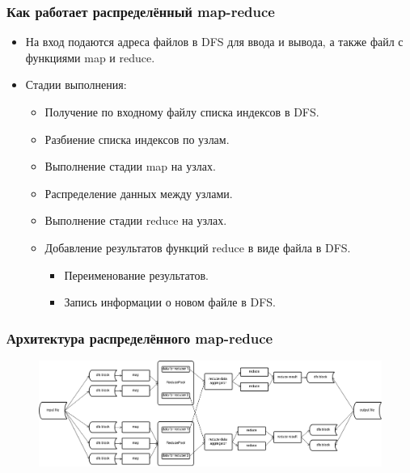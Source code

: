 \documentclass{beamer}
\begin{document}
    \begin{frame}
    \frametitle{Как работает распределённый map-reduce}
        \begin{itemize}
            \item На вход подаются адреса файлов в DFS для ввода и вывода, а также файл с функциями map и reduce.
            \item Стадии выполнения:
            \begin{itemize}
                \item Получение по входному файлу списка индексов в DFS.
                \item Разбиение списка индексов по узлам.
                \item Выполнение стадии map на узлах.
                \item Распределение данных между узлами.
                \item Выполнение стадии reduce на узлах.
                \item Добавление результатов функций reduce в виде файла в DFS.
                \begin{itemize}
                    \item Переименование результатов.
                    \item Запись информации о новом файле в DFS.
                \end{itemize} 
            \end{itemize} 
        \end{itemize}        
    \end{frame}

    \begin{frame}
    \frametitle{Архитектура распределённого map-reduce}
        \begin{figure}[h!]
            \begin{center}
                \includegraphics[scale=0.25]{total_data.png}
            \end{center}
        \end{figure}        
    \end{frame}
\end{document}
